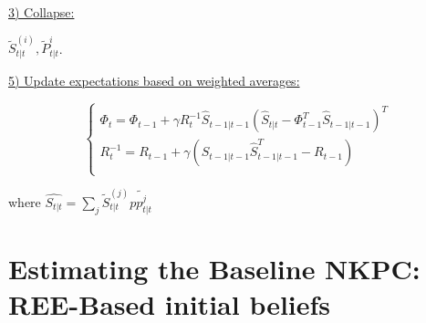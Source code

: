 \documentclass[12pt,reqno]{article}
\numberwithin{equation}{section}
\begin{document}
\noindent
\underline{3) Collapse:} \\
\vspace{1 mm}

\noindent
$\tilde{S}_{t|t}^{(i)}, \tilde{P}_{t|t}^{i} $.
\vspace{5 mm}

\underline{5) Update expectations based on weighted averages:} \\
\vspace{5 mm}

$$
\begin{cases}
\Phi_t = \Phi_{t-1} + \gamma R_t^{-1} \hat{S}_{t-1|t-1}(\hat{S}_{t|t}- \Phi_{t-1}^{T} \hat{S}_{t-1|t-1})^{T} \\
R_t^{-1} = R_{t-1} + \gamma (\hat{S}_{t-1|t-1}\hat{S}_{t-1|t-1}^{T} - R_{t-1}) \\
\end{cases}
$$

where $\hat{S_{t|t}} = \sum_{j} \tilde{S}_{t|t}^{(j)}\tilde{pp_{t|t}^{j}} $\



\newpage

\section*{Estimating the Baseline NKPC: REE-Based initial beliefs} 
\end{document}
